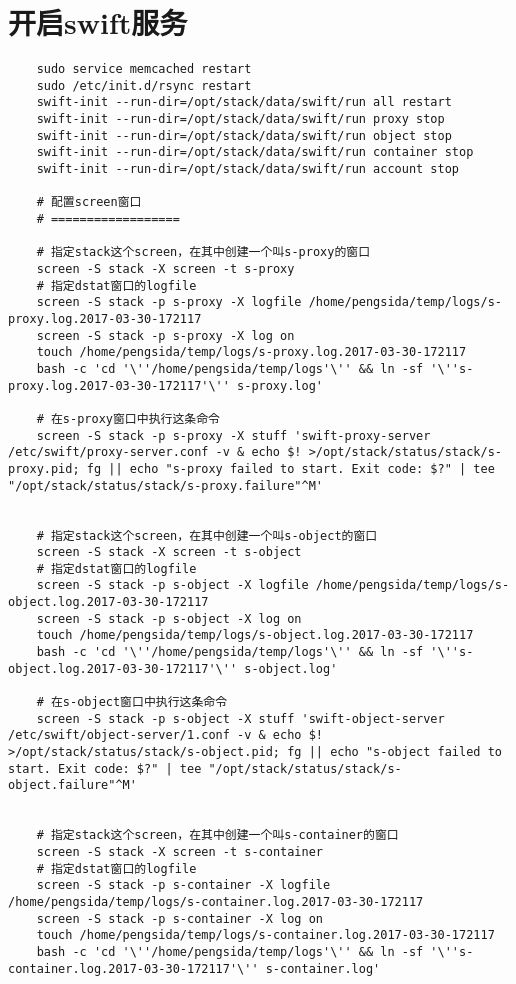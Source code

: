 \documentclass[a4paper,left=1.5cm,right=1.5cm,11pt]{article}
\begin{document}
\section{开启swift服务}
	\begin{lstlisting}
	sudo service memcached restart
	sudo /etc/init.d/rsync restart
    swift-init --run-dir=/opt/stack/data/swift/run all restart
	swift-init --run-dir=/opt/stack/data/swift/run proxy stop
	swift-init --run-dir=/opt/stack/data/swift/run object stop
	swift-init --run-dir=/opt/stack/data/swift/run container stop
	swift-init --run-dir=/opt/stack/data/swift/run account stop

	# 配置screen窗口
	# ==================

	# 指定stack这个screen，在其中创建一个叫s-proxy的窗口
	screen -S stack -X screen -t s-proxy
	# 指定dstat窗口的logfile
	screen -S stack -p s-proxy -X logfile /home/pengsida/temp/logs/s-proxy.log.2017-03-30-172117
    screen -S stack -p s-proxy -X log on
	touch /home/pengsida/temp/logs/s-proxy.log.2017-03-30-172117
    bash -c 'cd '\''/home/pengsida/temp/logs'\'' && ln -sf '\''s-proxy.log.2017-03-30-172117'\'' s-proxy.log'

	# 在s-proxy窗口中执行这条命令
	screen -S stack -p s-proxy -X stuff 'swift-proxy-server /etc/swift/proxy-server.conf -v & echo $! >/opt/stack/status/stack/s-proxy.pid; fg || echo "s-proxy failed to start. Exit code: $?" | tee "/opt/stack/status/stack/s-proxy.failure"^M'


	# 指定stack这个screen，在其中创建一个叫s-object的窗口
	screen -S stack -X screen -t s-object
	# 指定dstat窗口的logfile
	screen -S stack -p s-object -X logfile /home/pengsida/temp/logs/s-object.log.2017-03-30-172117
    screen -S stack -p s-object -X log on
	touch /home/pengsida/temp/logs/s-object.log.2017-03-30-172117
    bash -c 'cd '\''/home/pengsida/temp/logs'\'' && ln -sf '\''s-object.log.2017-03-30-172117'\'' s-object.log'

	# 在s-object窗口中执行这条命令
	screen -S stack -p s-object -X stuff 'swift-object-server /etc/swift/object-server/1.conf -v & echo $! >/opt/stack/status/stack/s-object.pid; fg || echo "s-object failed to start. Exit code: $?" | tee "/opt/stack/status/stack/s-object.failure"^M'


	# 指定stack这个screen，在其中创建一个叫s-container的窗口
	screen -S stack -X screen -t s-container
	# 指定dstat窗口的logfile
	screen -S stack -p s-container -X logfile /home/pengsida/temp/logs/s-container.log.2017-03-30-172117
    screen -S stack -p s-container -X log on
	touch /home/pengsida/temp/logs/s-container.log.2017-03-30-172117
    bash -c 'cd '\''/home/pengsida/temp/logs'\'' && ln -sf '\''s-container.log.2017-03-30-172117'\'' s-container.log'


\end{lstlisting}
\end{document}
